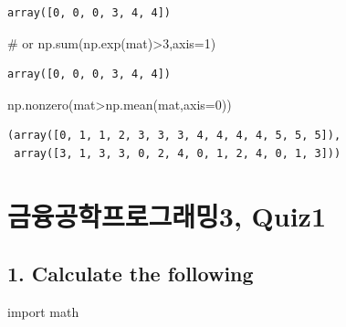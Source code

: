 \documentclass[
  letterpaper,
  DIV=11,
  numbers=noendperiod]{scrreprt}
\newenvironment{Shaded}{\begin{snugshade}}{\end{snugshade}}
\newcommand{\BuiltInTok}[1]{\textcolor[rgb]{0.00,0.23,0.31}{#1}}
\newcommand{\CommentTok}[1]{\textcolor[rgb]{0.37,0.37,0.37}{#1}}
\newcommand{\DecValTok}[1]{\textcolor[rgb]{0.68,0.00,0.00}{#1}}
\newcommand{\ImportTok}[1]{\textcolor[rgb]{0.00,0.46,0.62}{#1}}
\newcommand{\NormalTok}[1]{\textcolor[rgb]{0.00,0.23,0.31}{#1}}
\newcommand{\OperatorTok}[1]{\textcolor[rgb]{0.37,0.37,0.37}{#1}}
\begin{document}
\begin{verbatim}
array([0, 0, 0, 3, 4, 4])
\end{verbatim}

\begin{Shaded}
\begin{Highlighting}[]
\CommentTok{\# or}
\NormalTok{np.}\BuiltInTok{sum}\NormalTok{(np.exp(mat)}\OperatorTok{\textgreater{}}\DecValTok{3}\NormalTok{,axis}\OperatorTok{=}\DecValTok{1}\NormalTok{)}
\end{Highlighting}
\end{Shaded}

\begin{verbatim}
array([0, 0, 0, 3, 4, 4])
\end{verbatim}

\begin{Shaded}
\begin{Highlighting}[]
\NormalTok{np.nonzero(mat}\OperatorTok{\textgreater{}}\NormalTok{np.mean(mat,axis}\OperatorTok{=}\DecValTok{0}\NormalTok{))}
\end{Highlighting}
\end{Shaded}

\begin{verbatim}
(array([0, 1, 1, 2, 3, 3, 3, 4, 4, 4, 4, 5, 5, 5]),
 array([3, 1, 3, 3, 0, 2, 4, 0, 1, 2, 4, 0, 1, 3]))
\end{verbatim}

\chapter*{금융공학프로그래밍3,
Quiz1}\label{uxae08uxc735uxacf5uxd559uxd504uxb85cuxadf8uxb798uxbc0d3-quiz1}


\section*{1. Calculate the following}\label{calculate-the-following}


\begin{Shaded}
\begin{Highlighting}[]
\ImportTok{import}\NormalTok{ math}
\end{Highlighting}
\end{Shaded}
\end{document}

